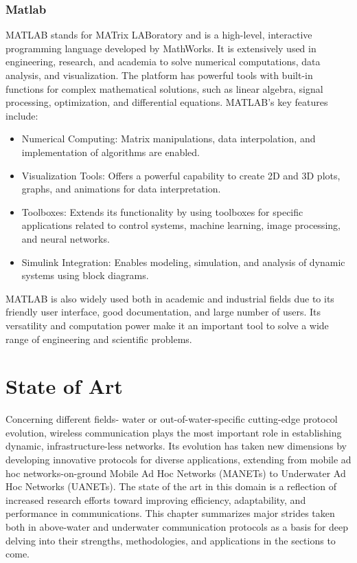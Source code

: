 \documentclass[]{nsm-thesis}
\begin{document}
\subsection{Matlab}
MATLAB stands for MATrix LABoratory and is a high-level, interactive programming language developed by MathWorks. It is extensively used in engineering, research, and academia to solve numerical computations, data analysis, and visualization. The platform has powerful tools with built-in functions for complex mathematical solutions, such as linear algebra, signal processing, optimization, and differential equations.
MATLAB's key features include:
\begin{itemize}
    \item Numerical Computing: Matrix manipulations, data interpolation, and implementation of algorithms are enabled.
    \item Visualization Tools: Offers a powerful capability to create 2D and 3D plots, graphs, and animations for data interpretation.
    \item Toolboxes: Extends its functionality by using toolboxes for specific applications related to control systems, machine learning, image processing, and neural networks.
    \item Simulink Integration: Enables modeling, simulation, and analysis of dynamic systems using block diagrams.
\end{itemize}
MATLAB is also widely used both in academic and industrial fields due to its friendly user interface, good documentation, and large number of users. Its versatility and computation power make it an important tool to solve a wide range of engineering and scientific problems.\cite{matlab}



\chapter{State of Art }
\label{sec:fundamentals}
Concerning different fields- water or out-of-water-specific cutting-edge protocol evolution, wireless communication plays the most important role in establishing dynamic, infrastructure-less networks. Its evolution has taken new dimensions by developing innovative protocols for diverse applications, extending from mobile ad hoc networks-on-ground Mobile Ad Hoc Networks  (MANETs) to Underwater Ad Hoc Networks (UANETs). The state of the art in this domain is a reflection of increased research efforts toward improving efficiency, adaptability, and performance in communications. This chapter summarizes major strides taken both in above-water and underwater communication protocols as a basis for deep delving into their strengths, methodologies, and applications in the sections to come.
\end{document}
